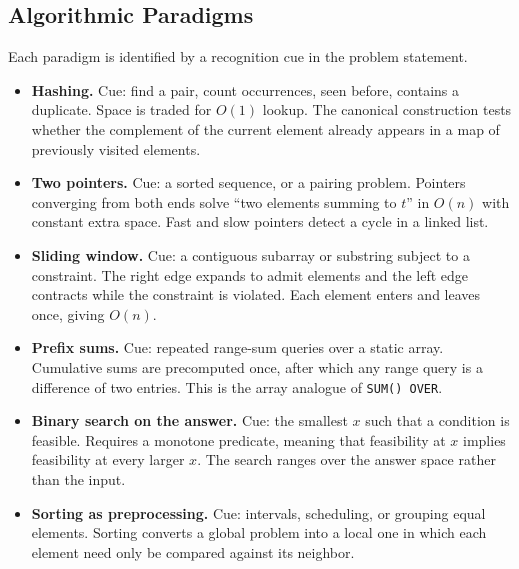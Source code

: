 \subsection{Algorithmic Paradigms}

Each paradigm is identified by a recognition cue in the problem statement.

\begin{itemize}
  \item \textbf{Hashing.} Cue: find a pair, count occurrences, seen before,
        contains a duplicate. Space is traded for $O(1)$ lookup. The canonical
        construction tests whether the complement of the current element
        already appears in a map of previously visited elements.

  \item \textbf{Two pointers.} Cue: a sorted sequence, or a pairing problem.
        Pointers converging from both ends solve ``two elements summing to
        $t$'' in $O(n)$ with constant extra space. Fast and slow pointers
        detect a cycle in a linked list.

  \item \textbf{Sliding window.} Cue: a contiguous subarray or substring
        subject to a constraint. The right edge expands to admit elements and
        the left edge contracts while the constraint is violated. Each element
        enters and leaves once, giving $O(n)$.

  \item \textbf{Prefix sums.} Cue: repeated range-sum queries over a static
        array. Cumulative sums are precomputed once, after which any range
        query is a difference of two entries. This is the array analogue of
        \texttt{SUM() OVER}.

  \item \textbf{Binary search on the answer.} Cue: the smallest $x$ such that
        a condition is feasible. Requires a monotone predicate, meaning that
        feasibility at $x$ implies feasibility at every larger $x$. The search
        ranges over the answer space rather than the input.

  \item \textbf{Sorting as preprocessing.} Cue: intervals, scheduling, or
        grouping equal elements. Sorting converts a global problem into a local
        one in which each element need only be compared against its neighbor.
\end{itemize}

